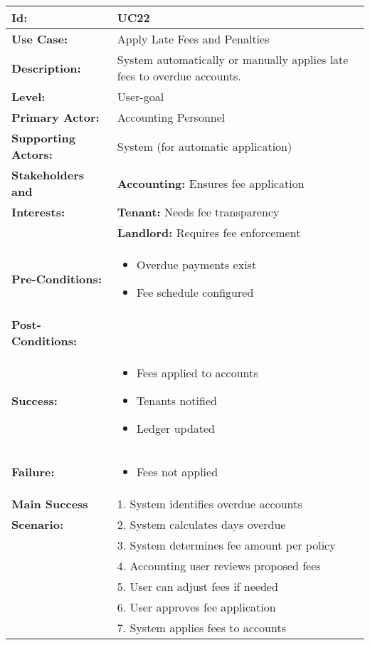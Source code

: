 \documentclass[12pt]{article}
\begin{document}
\begin{longtable}{|p{3cm}|p{11cm}|}
\hline
\textbf{Id:} & UC22 \\
\hline
\textbf{Use Case:} & Apply Late Fees and Penalties \\
\hline
\textbf{Description:} & System automatically or manually applies late fees to overdue accounts. \\
\hline
\textbf{Level:} & User-goal \\
\hline
\textbf{Primary Actor:} & Accounting Personnel \\
\hline
\textbf{Supporting Actors:} & System (for automatic application) \\
\hline
\textbf{Stakeholders and} & \textbf{Accounting:} Ensures fee application \\
\textbf{Interests:} & \textbf{Tenant:} Needs fee transparency \\
& \textbf{Landlord:} Requires fee enforcement \\
\hline
\textbf{Pre-Conditions:} & 
\begin{itemize}
    \item Overdue payments exist
    \item Fee schedule configured
\end{itemize} \\
\hline
\textbf{Post-Conditions:} & \\
\textbf{Success:} & 
\begin{itemize}
    \item Fees applied to accounts
    \item Tenants notified
    \item Ledger updated
\end{itemize} \\
\textbf{Failure:} & 
\begin{itemize}
    \item Fees not applied
\end{itemize} \\
\hline
\textbf{Main Success} & 1. System identifies overdue accounts \\
\textbf{Scenario:} & 2. System calculates days overdue \\
& 3. System determines fee amount per policy \\
& 4. Accounting user reviews proposed fees \\
& 5. User can adjust fees if needed \\
& 6. User approves fee application \\
& 7. System applies fees to accounts \\

\end{longtable}
\end{document}
